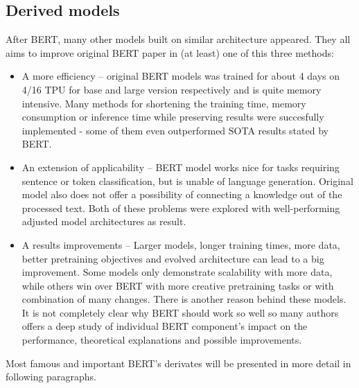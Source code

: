 \subsection{Derived models}
After BERT, many other models built on similar architecture appeared. They all aims to improve original BERT paper in (at least) one of this three methods:
\begin{itemize}
\item A more efficiency -- original BERT models was trained for about 4 days on 4/16 TPU for base and large version respectively and is quite memory intensive. Many methods for shortening the training time, memory consumption or inference time while preserving results were succesfully implemented - some of them even outperformed SOTA results stated by BERT.
\item An extension of applicability -- BERT model works nice for tasks requiring sentence or token classification, but is unable of language generation. Original model also does not offer a possibility of connecting a knowledge out of the processed text. Both of these problems were explored with well-performing adjusted model architectures as result. %
\item A results improvements -- Larger models, longer training times, more data,  better pretraining objectives and evolved architecture can lead to a big improvement. Some models only demonstrate scalability with more data, while others win over BERT with more creative pretraining tasks or with combination of many changes. There is another reason behind these models. It is not completely clear why BERT should work so well so many authors offers a deep study of individual BERT component's impact on the performance, theoretical explanations and possible improvements. %
\end{itemize}
 Most famous and important BERT's derivates will be presented in more detail in following paragraphs.
